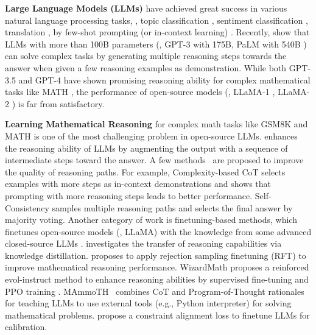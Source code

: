     \textbf{Large Language Models (LLMs)} \cite{devlin2019bert, liu2019roberta, gpt2, Colin2020t5,brown2020language, touvron2023llama1, sun2023survey} have achieved great success in various natural language processing tasks, \eg, topic classification \citep{min2022metaicl, jiang2023effective, jiang2023byom}, sentiment classification \citep{brown2020language, min2022metaicl}, translation \citep{brown2020language}, by few-shot prompting (or in-context learning) \citep{brown2020language, min2022metaicl, chen2022meta}. Recently, \citet{wei2022chain,wang2023selfconsistency} show that LLMs with more than 100B parameters (\eg, GPT-3 \citep{brown2020language} with 175B, PaLM with 540B \citep{chowdhery2022palm}) can solve complex tasks by generating multiple reasoning steps towards the answer when given a few reasoning examples as demonstration. While both GPT-3.5 \citep{gpt3-5} and GPT-4 \citep{gpt4} have shown promising reasoning ability for complex mathematical tasks like MATH \cite{hendrycks2021measuring}, the performance of open-source models (\eg, LLaMA-1 \citep{touvron2023llama1}, LLaMA-2 \citep{touvron2023llama}) is far from satisfactory.

    \vspace{-1mm}
    \textbf{Learning Mathematical Reasoning} for 
    complex math tasks
    like GSM8K \citep{cobbe2021training} and MATH \citep{hendrycks2021measuring} is one of the most challenging
    problem in open-source LLMs.
    \citet{wei2022chain} enhances the reasoning ability of LLMs by augmenting the output with a sequence of intermediate steps toward the answer. 
    A few methods~\citep{fu2023complexitybased,wang2023selfconsistency,zhou2023leasttomost} are proposed to 
    improve the quality of reasoning paths.
    For example,
    Complexity-based CoT \citep{fu2023complexitybased}
    selects examples with more steps as in-context demonstrations and shows that prompting with more reasoning steps leads to better performance.
    Self-Consistency \citep{wang2023selfconsistency}
    samples multiple reasoning paths
    and selects the final answer by majority voting.   
    Another category of work is finetuning-based methods, which finetunes open-source models (\eg, LLaMA) with the knowledge from some advanced closed-source LLMs \citep{gpt3-5,gpt4}. 
    \citet{magister2023teaching} investigates the transfer of reasoning capabilities via knowledge distillation. 
    \citet{yuan2023scaling} proposes to apply rejection sampling finetuning (RFT) to improve mathematical reasoning performance.  
    WizardMath \citep{luo2023wizardmath} proposes a reinforced evol-instruct method to enhance reasoning abilities by supervised fine-tuning and PPO training \citep{schulman2017proximal}. MAmmoTH~\citep{yue2023mammoth} combines CoT and Program-of-Thought \citep{chen2022program} rationales for teaching LLMs to use external tools (e.g., Python interpreter) for solving mathematical problems. \citet{wang2023making} propose a constraint alignment loss to finetune LLMs for calibration.
    
